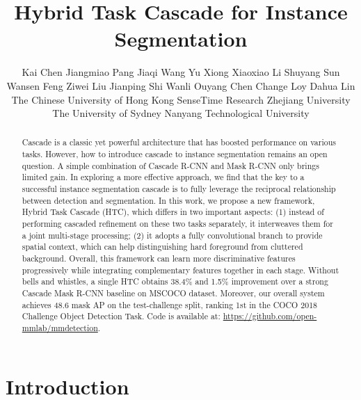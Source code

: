 \documentclass[10pt,twocolumn,letterpaper]{article}
\begin{document}
\title{Hybrid Task Cascade for Instance Segmentation}

\author{Kai Chen \quad Jiangmiao Pang \quad Jiaqi Wang \quad Yu Xiong \quad Xiaoxiao Li \quad Shuyang Sun\\
Wansen Feng \quad Ziwei Liu \quad Jianping Shi \quad Wanli Ouyang \quad Chen Change Loy \quad Dahua Lin\\
The Chinese University of Hong Kong \quad SenseTime Research \quad Zhejiang University \\
The University of Sydney \quad Nanyang Technological University\\
}

\maketitle
\thispagestyle{empty}



\begin{abstract}

Cascade is a classic yet powerful architecture that has boosted performance on
various tasks. However, how to introduce cascade to instance segmentation remains
an open question. A simple combination of Cascade R-CNN and Mask R-CNN
only brings limited gain.
In exploring a more effective approach, we find that the key to a successful
instance segmentation cascade is to fully leverage the reciprocal relationship
between detection and segmentation.
In this work, we propose a new framework, Hybrid Task Cascade (HTC), which
differs in two important aspects:
(1) instead of performing cascaded refinement on these two tasks separately,
it interweaves them for a joint multi-stage processing;
(2) it adopts a fully convolutional branch to provide spatial context, which can
help distinguishing hard foreground from cluttered background.
Overall, this framework can learn more discriminative features
progressively while integrating complementary features together in each stage.
Without bells and whistles, a single HTC obtains
38.4\% and 1.5\% improvement over a strong Cascade Mask R-CNN
baseline on MSCOCO dataset.
Moreover, our overall system achieves 48.6 mask AP on the test-challenge split, ranking 1st in the COCO 2018 Challenge Object Detection Task.
Code is available at: \url{https://github.com/open-mmlab/mmdetection}.

\end{abstract}
 

\section{Introduction}
\label{sec:intro}
\end{document}
